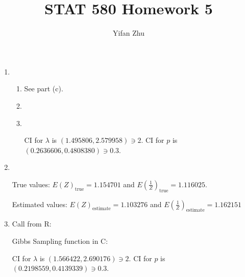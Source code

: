 \documentclass{article}
\begin{document}
	

	
	\title{STAT 580 Homework 5}
	\author{Yifan Zhu}
	\maketitle
	
	\begin{enumerate}[leftmargin = 0 em, label = \arabic*., font = \bfseries]
	\item 
	\begin{enumerate}
		\item 
		See part (c).
		\item 

		\item \ 

		 

		CI for $\lambda$ is $(1.495806, 2.579958) \owns 2$. 
		CI for $p$ is $(0.2636606, 0.4808380) \owns 0.3$. 

	\end{enumerate}
	

	\item \ 

	

	True values: $E \left( Z \right)_{\mathrm{true}} = 1.154701 $ and $E \left( \frac{1}{Z} \right)_{\mathrm{true}} = 1.116025 $.

	Estimated values: $E \left( Z \right)_{\mathrm{estimate}} = 1.103276$ and $E \left( \frac{1}{Z} \right)_{\mathrm{estimate}} = 1.162151 $


	\item Call from R:
	

	Gibbs Sampling function in C:
	
	CI for $\lambda$ is $(1.566422, 2.690176) \owns 2$. 
	CI for $p$ is $(0.2198559, 0.4139339) \owns 0.3$. 
	
 	\end{enumerate}
	
	
\end{document}
